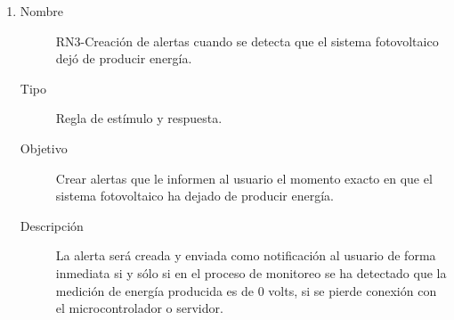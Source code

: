 \begin{enumerate}[label=RN\arabic*.]
    \item \label{RN3}
		\begin{description}
			\item[Nombre] RN3-Creación de alertas cuando se detecta que el sistema fotovoltaico dejó de producir energía.
			\item[Tipo] Regla de estímulo y respuesta.
			\item[Objetivo] Crear alertas que le informen al usuario el momento exacto en que el sistema fotovoltaico ha dejado de producir energía.
			\item[Descripción] La alerta será creada y enviada como notificación al usuario de forma inmediata si y sólo si en el proceso de monitoreo se ha detectado que la medición de energía producida es de 0 volts, si se pierde conexión con el microcontrolador o servidor.  
    		\end{description}
    		

\end{enumerate}
